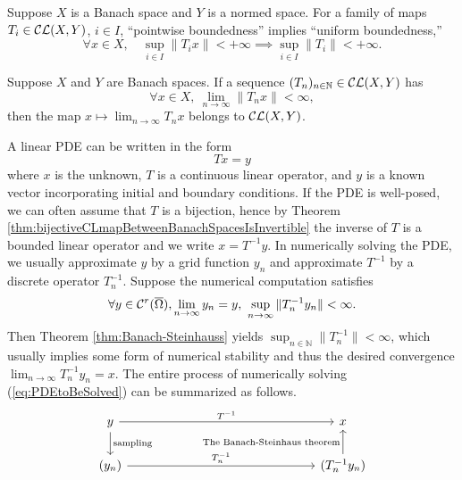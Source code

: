 \begin{thm}
  \label{thm:uniform-boundedness}
  Suppose $X$ is a Banach space and $Y$ is a normed space.
  For a family of maps $T_i\in {\cal CL}(X,Y)$, $i\in I$, 
  ``pointwise boundedness''
  implies ``uniform boundedness,'' %
  \begin{equation}
    \label{eq:uniform-boundedness}
    \forall x\in X,\quad
    \sup_{i\in I} \|T_i x\| < +\infty
     \implies 
    \sup_{i\in I} \|T_i\| <+\infty.
  \end{equation}
\end{thm}

\begin{thm}
  \label{thm:Banach-Steinhauss}
  Suppose $X$ and $Y$ are Banach spaces.
  If a sequence $(T_n)_{n\in \mathbb{N}}\in {\cal CL}(X,Y)$
  has
  \begin{displaymath}
    \forall x\in X, \
    \lim_{n\rightarrow \infty} \|T_n x\| < \infty, 
  \end{displaymath}
  then the map $x\mapsto \lim_{n\rightarrow \infty} T_n x$
  belongs to ${\cal CL}(X,Y)$.
\end{thm}

\begin{exm}
  A linear PDE can be written in the form
  \begin{equation}
    \label{eq:PDEtoBeSolved}
    Tx = y
  \end{equation}
  where $x$ is the unknown, 
  $T$ is a continuous linear operator,
  and $y$ is a known vector incorporating initial and boundary
  conditions. 
  If the PDE is well-posed, we can often assume
  that $T$ is a bijection,
  hence by Theorem
  \ref{thm:bijectiveCLmapBetweenBanachSpacesIsInvertible}
  the inverse of $T$ is a bounded linear operator
  and we write $x=T^{-1}y$.
  In numerically solving the PDE,
  we usually approximate $y$ by a grid function $y_n$ 
  and approximate $T^{-1}$ by a discrete operator $T^{-1}_n$.
  Suppose the numerical computation satisfies 
  \begin{displaymath}
    \forall y\in {\cal C}^r(\overline{\Omega}),
    \lim_{n\rightarrow \infty} y_n = y,\
    \sup_{n\rightarrow \infty} \|T^{-1}_n y_n\|<\infty.
  \end{displaymath}
  Then Theorem \ref{thm:Banach-Steinhauss} yields 
  $\sup_{n\in \mathbb{N}}\|T_n^{-1}\|<\infty$,
  which usually implies some form of numerical stability
  and thus the desired convergence
  $\lim_{n\rightarrow \infty} T^{-1}_n y_n = x$. 
  The entire process of numerically solving (\ref{eq:PDEtoBeSolved})
  can be summarized as follows.
  \begin{displaymath}
    \begin{tikzcd}[column sep=15em]
      y \ar{r}{T^{-1}}
      \ar{d}{\textrm{sampling}} 
      & x 
      \\
      (y_n) %
      \ar{r}{T_n^{-1}}
      & (T_n^{-1}y_n) 
      \ar{u}{\textrm{The Banach-Steinhaus theorem}}
    \end{tikzcd}
  \end{displaymath}
\end{exm}


